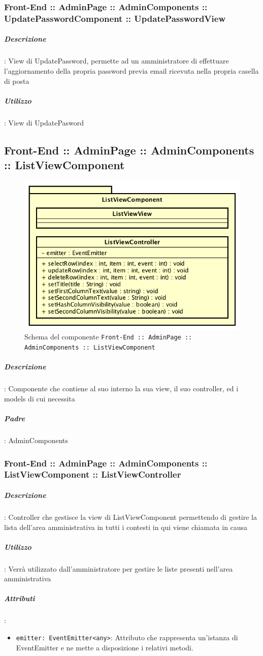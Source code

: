 \documentclass[../ManualeSviluppatore_v1.0.0.tex]{subfiles}
\begin{document}
				\subsubsection{Front-End :: AdminPage :: AdminComponents :: UpdatePasswordComponent :: UpdatePasswordView}

		      		\subparagraph{Descrizione}: View di UpdatePassword, permette ad un amministratore di effettuare l'aggiornamento della propria password previa email ricevuta nella propria casella di posta
			      	\subparagraph{Utilizzo}: View di UpdatePasword


	\newpage
	\subsection{Front-End :: AdminPage :: AdminComponents :: ListViewComponent}
	\begin{figure}[!h]
		\centering
		\includegraphics[scale=0.6]{Architettura/Front-End/AdminPage/AdminComponents/ListViewComponent.png}
		\caption{Schema del componente \texttt{Front-End :: AdminPage :: AdminComponents :: ListViewComponent}}
	\end{figure}

			\subparagraph{Descrizione}: Componente che contiene al suo interno la sua view, il suo controller, ed i models di cui necessita
			\subparagraph{Padre}: AdminComponents
			      \subsubsection{Front-End :: AdminPage :: AdminComponents :: ListViewComponent :: ListViewController}
			      	\subparagraph{Descrizione}: Controller che gestisce la view di ListViewComponent permettendo di gestire la lista dell'area amministrativa in tutti i contesti in qui viene chiamata in causa
			      	\subparagraph{Utilizzo}: Verrà utilizzato dall'amministratore per gestire le liste presenti nell'area amministrativa
			      	\subparagraph{Attributi}:
			      	      \begin{itemize}
			      	      	\item \texttt{emitter: EventEmitter<any>}: Attributo che rappresenta un'istanza di EventEmitter e ne mette a disposizione i relativi metodi.
			      	      \end{itemize}
\end{document}
